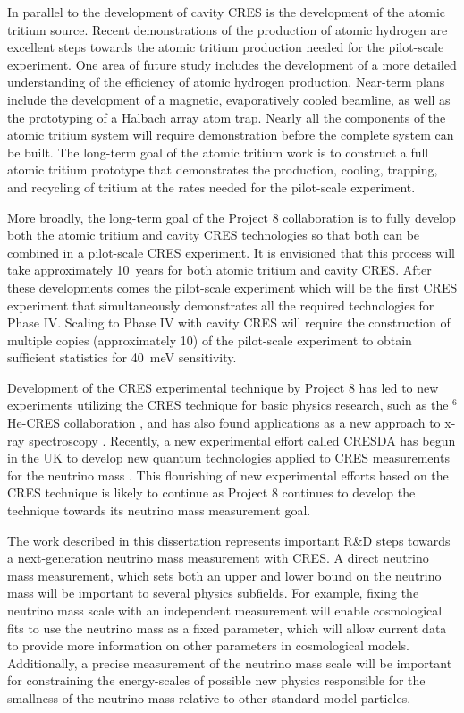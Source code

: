 In parallel to the development of cavity CRES is the development of the atomic tritium source. Recent demonstrations of the production of atomic hydrogen are excellent steps towards the atomic tritium production needed for the pilot-scale experiment. One area of future study includes the development of a more detailed understanding of the efficiency of atomic hydrogen production. Near-term plans include the development of a magnetic, evaporatively cooled beamline, as well as the prototyping of a Halbach array atom trap. Nearly all the components of the atomic tritium system will require demonstration before the complete system can be built. The long-term goal of the atomic tritium work is to construct a full atomic tritium prototype that demonstrates the production, cooling, trapping, and recycling of tritium at the rates needed for the pilot-scale experiment.

More broadly, the long-term goal of the Project 8 collaboration is to fully develop both the atomic tritium and cavity CRES technologies so that both can be combined in a pilot-scale CRES experiment. It is envisioned that this process will take approximately 10~years for both atomic tritium and cavity CRES. After these developments comes the pilot-scale experiment which will be the first CRES experiment that simultaneously demonstrates all the required technologies for Phase IV. Scaling to Phase IV with cavity CRES will require the construction of multiple copies (approximately 10) of the pilot-scale experiment to obtain sufficient statistics for 40~meV sensitivity.

Development of the CRES experimental technique by Project 8 has led to new experiments utilizing the CRES technique for basic physics research, such as the $^6$He-CRES collaboration \cite{cresHe6}, and has also found applications as a new approach to x-ray spectroscopy \cite{cresXrayKazkaz}. Recently, a new experimental effort called CRESDA has begun in the UK to develop new quantum technologies applied to CRES measurements for the neutrino mass \cite{cresda}. This flourishing of new experimental efforts based on the CRES technique is likely to continue as Project 8 continues to develop the technique towards its neutrino mass measurement goal.

The work described in this dissertation represents important R\&D steps towards a next-generation neutrino mass measurement with CRES. A direct neutrino mass measurement, which sets both an upper and lower bound on the neutrino mass will be important to several physics subfields. For example, fixing the neutrino mass scale with an independent measurement will enable cosmological fits to use the neutrino mass as a fixed parameter, which will allow current data to provide more information on other parameters in cosmological models. Additionally, a precise measurement of the neutrino mass scale will be important for constraining the energy-scales of possible new physics responsible for the smallness of the neutrino mass relative to other standard model particles. 

